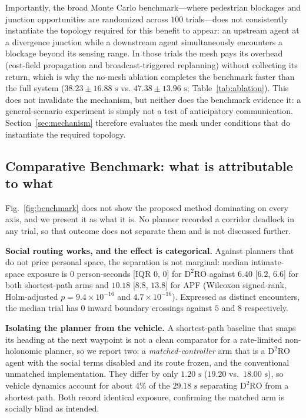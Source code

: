 \documentclass[journal]{IEEEtran}
\begin{document}
Importantly, the broad Monte Carlo benchmark---where pedestrian blockages and junction opportunities are randomized across $100$ trials---does not consistently instantiate the topology required for this benefit to appear: an upstream agent at a divergence junction while a downstream agent simultaneously encounters a blockage beyond its sensing range. In those trials the mesh pays its overhead (cost-field propagation and broadcast-triggered replanning) without collecting its return, which is why the no-mesh ablation completes the benchmark faster than the full system ($38.23 \pm 16.88\text{ s}$ vs. $47.38 \pm 13.96\text{ s}$; Table~\ref{tab:ablation}). This does not invalidate the mechanism, but neither does the benchmark evidence it: a general-scenario experiment is simply not a test of anticipatory communication. Section~\ref{sec:mechanism} therefore evaluates the mesh under conditions that do instantiate the required topology.

\subsection{Comparative Benchmark: what is attributable to what}
\label{sec:tradeoff}
Fig.~\ref{fig:benchmark} does not show the proposed method dominating on every axis,
and we present it as what it is. No planner recorded a corridor deadlock in any
trial, so that outcome does not separate them and is not discussed further.

\textbf{Social routing works, and the effect is categorical.} Against planners that
do not price personal space, the separation is not marginal: median intimate-space
exposure is $0$ person-seconds [IQR $0$, $0$] for $\text{D}^2\text{RO}$ against
$6.40$ [$6.2$, $6.6$] for both shortest-path arms and $10.18$ [$8.8$, $13.8$] for
APF (Wilcoxon signed-rank, Holm-adjusted $p = 9.4\times10^{-16}$ and
$4.7\times10^{-16}$). Expressed as distinct encounters, the median trial has $0$
inward boundary crossings against $5$ and $8$ respectively.

\textbf{Isolating the planner from the vehicle.} A shortest-path baseline that snaps
its heading at the next waypoint is not a clean comparator for a rate-limited
non-holonomic planner, so we report two: a \emph{matched-controller} arm that is a
$\text{D}^2\text{RO}$ agent with the social terms disabled and its route frozen, and
the conventional unmatched implementation. They differ by only $1.20\text{ s}$
($19.20$ vs.\ $18.00\text{ s}$), so vehicle dynamics account for about $4\%$ of the
$29.18\text{ s}$ separating $\text{D}^2\text{RO}$ from a shortest path. Both record
identical exposure, confirming the matched arm is socially blind as intended.
\end{document}

